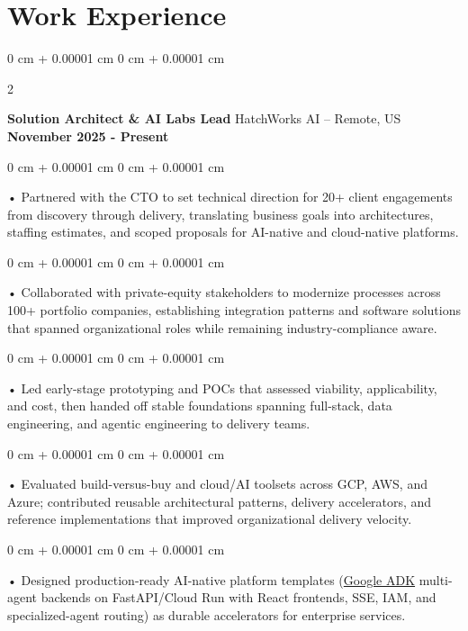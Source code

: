 \documentclass[10pt, letterpaper]{article}
\newenvironment{onecolentry}{
    \begin{adjustwidth}{
        0 cm + 0.00001 cm
    }{
        0 cm + 0.00001 cm
    }
}{
    \end{adjustwidth}
} %
\newenvironment{twocolentry}[2][]{
    \onecolentry
    \def\secondColumn{#2}
    \setcolumnwidth{\fill, 4.5 cm}
    \begin{paracol}{2}
}{
    \switchcolumn \raggedleft \secondColumn
    \end{paracol}
    \endonecolentry
} %
\begin{document}
    \vspace{0.5cm}
    \section{Work Experience}
        \vspace{0.1cm}

        \begin{twocolentry}{
            \textbf{November 2025 - Present}
        }
            \textbf{Solution Architect \& AI Labs Lead} HatchWorks AI -- Remote, US\end{twocolentry}

        \begin{onecolentry}
             • Partnered with the CTO to set technical direction for 20+ client engagements from discovery through delivery, translating business goals into architectures, staffing estimates, and scoped proposals for AI-native and cloud-native platforms.
        \end{onecolentry}
        \begin{onecolentry}
             • Collaborated with private-equity stakeholders to modernize processes across 100+ portfolio companies, establishing integration patterns and software solutions that spanned organizational roles while remaining industry-compliance aware.
        \end{onecolentry}
        \begin{onecolentry}
             • Led early-stage prototyping and POCs that assessed viability, applicability, and cost, then handed off stable foundations spanning full-stack, data engineering, and agentic engineering to delivery teams.
        \end{onecolentry}
        \begin{onecolentry}
             • Evaluated build-versus-buy and cloud/AI toolsets across GCP, AWS, and Azure; contributed reusable architectural patterns, delivery accelerators, and reference implementations that improved organizational delivery velocity.
        \end{onecolentry}
        \begin{onecolentry}
             • Designed production-ready AI-native platform templates (\href{https://github.com/sreenikethaathreya-hw/adksolutionsaccelerator}{Google ADK} multi-agent backends on FastAPI/Cloud Run with React frontends, SSE, IAM, and specialized-agent routing) as durable accelerators for enterprise services.
        \end{onecolentry}
\end{document}
